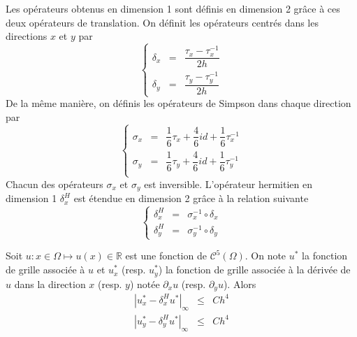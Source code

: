 Les opérateurs obtenus en dimension 1 sont définis en dimension 2 grâce à ces deux opérateurs de translation. On définit les opérateurs centrés dans les directions $x$ et $y$ par 
\begin{equation}
\left\lbrace
\begin{array}{rcl}
\delta_x & = & \dfrac{\tau_x - \tau_x^{-1}}{2h} \\
\delta_y & = & \dfrac{\tau_y - \tau_y^{-1}}{2h}
\end{array}
\right.
\label{eq:der_centrée_2D}
\end{equation}
De la même manière, on définis les opérateurs de Simpson dans chaque direction par 
\begin{equation}
\left\lbrace
\begin{array}{rcl}
\sigma_x & = & \dfrac{1}{6} \tau_x + \dfrac{4}{6} id + \dfrac{1}{6} \tau_x^{-1} \\
\sigma_y & = & \dfrac{1}{6} \tau_y + \dfrac{4}{6} id + \dfrac{1}{6} \tau_y^{-1} \\
\end{array}
\right.
\label{eq:simpson_2D}
\end{equation}
Chacun des opérateurs $\sigma_x$ et $\sigma_y$ est inversible.
L'opérateur hermitien en dimension 1 $\delta_x^H$ est étendue en dimension 2 grâce à la relation suivante 
\begin{equation}
\left\lbrace
\begin{array}{rcl}
\delta_x^H & = & \sigma_x^{-1} \circ \delta_x \\
\delta_y^H & = & \sigma_y^{-1} \circ \delta_y
\end{array}
\right.
\label{eq:der_herm_2D}
\end{equation}

\begin{theoreme}
Soit $u : x \in \Omega \mapsto u(x) \in \mathbb{R}$ est une fonction de $\mathcal{C}^5 (\Omega)$. On note $u^*$ la fonction de grille associée à $u$ et $u_x^*$ (resp. $u_y^*$) la fonction de grille associée à la dérivée de $u$ dans la direction $x$ (resp. $y$) notée $\partial_x u$ (resp. $\partial_y u$). Alors
\begin{equation}
\begin{array}{rcl}
|u^*_{x} - \delta_x^H u^*|_{\infty} &\leq& C h^4\\
|u^*_{y} - \delta_y^H u^*|_{\infty} &\leq& C h^4
\end{array}
\end{equation}
\end{theoreme}

